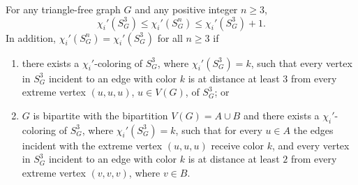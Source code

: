 \documentclass[10pt,a4paper]{amsart}
\begin{document}
\begin{theorem}
\label{thm:triangle-free}
For any triangle-free graph $G$ and any positive integer $n\ge 3$,
	$$\chi_i'(S_G^3)\le \chi_i'(S_G^n)\le \chi_i'(S_G^3)+1.$$
In addition, $\chi_i'(S_G^n)=\chi_i'(S_G^3)$ for all $n\ge 3$ if
\begin{enumerate}[label=(\roman*),noitemsep]
    \item there exists a $\chi_i'$-coloring of $S_G^3$, where $\chi_i'(S_G^3)=k$, such that every vertex in $S_G^3$ incident to an edge with color $k$ is at distance at least $3$ from every extreme vertex $(u,u,u)$, $u\in V(G)$, of $S_G^3$; or
    \item $G$ is bipartite with the bipartition $V(G)=A\cup B$ and there exists a $\chi_i'$-coloring of $S_G^3$, where $\chi_i'(S_G^3)=k$, such that for every $u\in A$ the edges incident with the extreme vertex $(u,u,u)$ receive color $k$, and every vertex in $S_G^3$ incident to an edge with color $k$ is at distance at least $2$ from every extreme vertex $(v,v,v)$, where $v\in B$.
\end{enumerate}
\label{thm:SG3}
\end{theorem}
\end{document}
